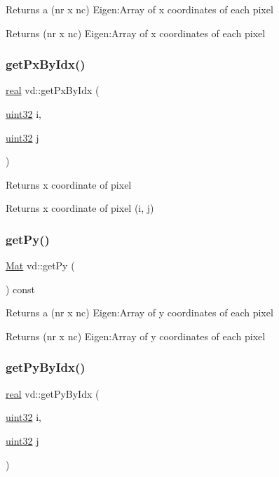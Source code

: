 Returns a (nr x nc) Eigen\+:Array of x coordinates of each pixel \begin{DoxyReturn}{Returns}
(nr x nc) Eigen\+:Array of x coordinates of each pixel 
\end{DoxyReturn}
\mbox{\label{classvd_aa80f528bca24356805f2a31234e67ac1}} 
\subsubsection{\texorpdfstring{get\+Px\+By\+Idx()}{getPxByIdx()}}
{\footnotesize\ttfamily \mbox{\hyperlink{typedefs_8cpp_a58a0c7cf2501f4492da833421be92547}{real}} vd\+::get\+Px\+By\+Idx (\begin{DoxyParamCaption}\item[{\mbox{\hyperlink{typedefs_8cpp_a8ad23e2333787a214e20a58a284a5a60}{uint32}}}]{i,  }\item[{\mbox{\hyperlink{typedefs_8cpp_a8ad23e2333787a214e20a58a284a5a60}{uint32}}}]{j }\end{DoxyParamCaption})}

Returns x coordinate of pixel \begin{DoxyReturn}{Returns}
x coordinate of pixel (i, j) 
\end{DoxyReturn}
\mbox{\label{classvd_a9738711704b1d03cdbe027b1976cb0c6}} 
\subsubsection{\texorpdfstring{get\+Py()}{getPy()}}
{\footnotesize\ttfamily \mbox{\hyperlink{typedefs_8cpp_a9fa28c1f74e909474857584f5c7b0088}{Mat}} vd\+::get\+Py (\begin{DoxyParamCaption}{ }\end{DoxyParamCaption}) const}

Returns a (nr x nc) Eigen\+:Array of y coordinates of each pixel \begin{DoxyReturn}{Returns}
(nr x nc) Eigen\+:Array of y coordinates of each pixel 
\end{DoxyReturn}
\mbox{\label{classvd_ae6c4ff0f49e07803f5dd13545f6e8f3f}} 
\subsubsection{\texorpdfstring{get\+Py\+By\+Idx()}{getPyByIdx()}}
{\footnotesize\ttfamily \mbox{\hyperlink{typedefs_8cpp_a58a0c7cf2501f4492da833421be92547}{real}} vd\+::get\+Py\+By\+Idx (\begin{DoxyParamCaption}\item[{\mbox{\hyperlink{typedefs_8cpp_a8ad23e2333787a214e20a58a284a5a60}{uint32}}}]{i,  }\item[{\mbox{\hyperlink{typedefs_8cpp_a8ad23e2333787a214e20a58a284a5a60}{uint32}}}]{j }\end{DoxyParamCaption})}

